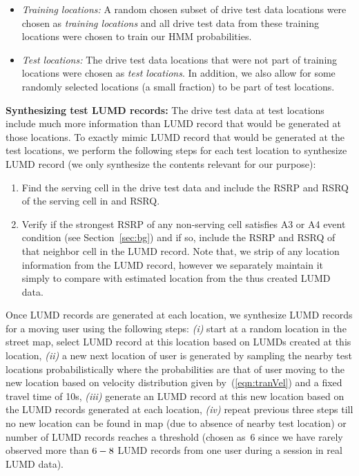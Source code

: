 \documentclass[conference, 10pt]{IEEEtran}
\begin{document}
\begin{itemize}

	\item {\em Training locations:} A random chosen subset of drive test data
		locations were chosen as {\em training locations} and all drive test data
		from these training locations were chosen to train our HMM
		probabilities. 

	\item {\em Test locations:} The drive test data locations that were not part
		of training locations were chosen as {\em test locations}. In addition, we
		also allow for some randomly selected locations (a small fraction) to be part of test
		locations. 
\end{itemize}
		
		
{\bf Synthesizing test LUMD records:} The drive test data at test locations
include much more information than LUMD record that would be generated at those
locations. To exactly mimic LUMD record that would be generated at the test
locations, we perform the following steps for each test location to synthesize LUMD
record (we only synthesize the contents relevant for our purpose): 

\begin{enumerate}
	
\item Find the serving cell in the drive test data and include the RSRP
and RSRQ of the serving cell in and RSRQ.

\item  Verify if the strongest RSRP of any non-serving cell satisfies A3 or A4 event
condition (see Section~\ref{sec:bg}) and if so, include the RSRP and RSRQ of
that neighbor cell in the LUMD record. Note that, we strip of any location
information from the LUMD record, however we separately maintain it simply to
compare with estimated location from the thus created LUMD data. 

\end{enumerate}

Once LUMD records are generated at each location, we synthesize LUMD records for a
moving user using the following steps: {\em (i)} start at a random location in the
street map, select LUMD record at this location based on LUMDs created at this
location, {\em (ii)} a new next location of user is generated by sampling the nearby
test locations probabilistically where the probabilities are that of user moving to
the new location based on velocity distribution given by~(\ref{eqn:tranVel}) and a fixed
travel time of 10s, {\em (iii)}  generate an LUMD record at this new location based
on the LUMD records generated at each location, {\em (iv)} repeat previous three
steps till no new location can be found in map (due to absence of nearby test
location) or number of LUMD records reaches a threshold (chosen as~6 since we have
rarely observed more than $6\--8$ LUMD records from one user during a session in real
LUMD data).
\end{document}
